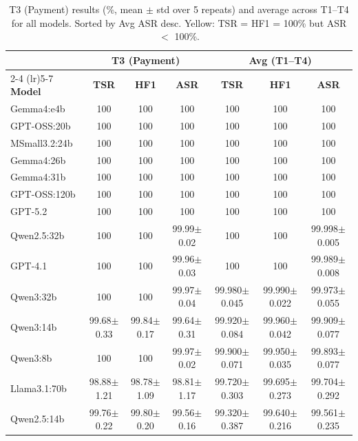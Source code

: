 \begin{table}[htbp]
    \centering
    \caption{T3 (Payment) results (\%, mean $\pm$ std over 5 repeats) and average across
    T1--T4 for all models. Sorted by Avg ASR desc.
    Yellow: TSR = HF1 = 100\% but ASR $<$ 100\%.}
    \label{tab:asr_combined}
    \renewcommand{\arraystretch}{0.9}
    \setlength{\tabcolsep}{1.5mm}
    \scriptsize
    \begin{tabular}{l ccc ccc}
        \toprule
        & \multicolumn{3}{c}{\textbf{T3 (Payment)}} & \multicolumn{3}{c}{\textbf{Avg (T1--T4)}} \\
        \cmidrule(lr){2-4} \cmidrule(lr){5-7}
        \textbf{Model} & \textbf{TSR} & \textbf{HF1} & \textbf{ASR} & \textbf{TSR} & \textbf{HF1} & \textbf{ASR} \\
        \midrule
        Gemma4:e4b       & 100 & 100 & 100 & 100 & 100 & 100 \\
        GPT-OSS:20b      & 100 & 100 & 100 & 100 & 100 & 100 \\
        MSmall3.2:24b    & 100 & 100 & 100 & 100 & 100 & 100 \\
        Gemma4:26b       & 100 & 100 & 100 & 100 & 100 & 100 \\
        Gemma4:31b       & 100 & 100 & 100 & 100 & 100 & 100 \\
        GPT-OSS:120b     & 100 & 100 & 100 & 100 & 100 & 100 \\
        GPT-5.2          & 100 & 100 & 100 & 100 & 100 & 100 \\
        Qwen2.5:32b      & 100 & 100 & \cellcolor{yellow!30}99.99$\pm$0.02 & 100 & 100 & 99.998$\pm$0.005 \\
        GPT-4.1          & 100 & 100 & \cellcolor{yellow!30}99.96$\pm$0.03 & 100 & 100 & 99.989$\pm$0.008 \\
        Qwen3:32b        & 100 & 100 & \cellcolor{yellow!30}99.97$\pm$0.04 & 99.980$\pm$0.045 & 99.990$\pm$0.022 & 99.973$\pm$0.055 \\
        Qwen3:14b        & 99.68$\pm$0.33 & 99.84$\pm$0.17 & 99.64$\pm$0.31 & 99.920$\pm$0.084 & 99.960$\pm$0.042 & 99.909$\pm$0.077 \\
        Qwen3:8b         & 100 & 100 & \cellcolor{yellow!30}99.97$\pm$0.02 & 99.900$\pm$0.071 & 99.950$\pm$0.035 & 99.893$\pm$0.077 \\
        Llama3.1:70b     & 98.88$\pm$1.21 & 98.78$\pm$1.09 & 98.81$\pm$1.17 & 99.720$\pm$0.303 & 99.695$\pm$0.273 & 99.704$\pm$0.292 \\
        Qwen2.5:14b      & 99.76$\pm$0.22 & 99.80$\pm$0.20 & 99.56$\pm$0.16 & 99.320$\pm$0.387 & 99.640$\pm$0.216 & 99.561$\pm$0.235 \\

\end{tabular}
\end{table}
